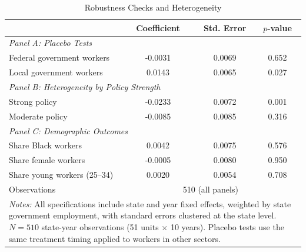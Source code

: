 \begin{table}[htbp]
\centering
\caption{Robustness Checks and Heterogeneity}
\label{tab:robust}
\begin{tabular}{lccc}
\hline\hline
 & Coefficient & Std. Error & $p$-value \\
\hline
\multicolumn{4}{l}{\textit{Panel A: Placebo Tests}} \\
[0.3em]
Federal government workers & -0.0031 & 0.0069 & 0.652 \\
Local government workers & 0.0143 & 0.0065 & 0.027 \\
[0.5em]
\multicolumn{4}{l}{\textit{Panel B: Heterogeneity by Policy Strength}} \\
[0.3em]
Strong policy & -0.0233 & 0.0072 & 0.001 \\
Moderate policy & -0.0085 & 0.0085 & 0.316 \\
[0.5em]
\multicolumn{4}{l}{\textit{Panel C: Demographic Outcomes}} \\
[0.3em]
Share Black workers & 0.0042 & 0.0075 & 0.576 \\
Share female workers & -0.0005 & 0.0080 & 0.950 \\
Share young workers (25--34) & 0.0020 & 0.0054 & 0.708 \\
[0.5em]
Observations & \multicolumn{3}{c}{510 (all panels)} \\
\hline\hline
\multicolumn{4}{p{10cm}}{\footnotesize \textit{Notes:} All specifications include state and year fixed effects, weighted by state government employment, with standard errors clustered at the state level. $N = 510$ state-year observations (51 units $\times$ 10 years). Placebo tests use the same treatment timing applied to workers in other sectors.}
\end{tabular}
\end{table}
